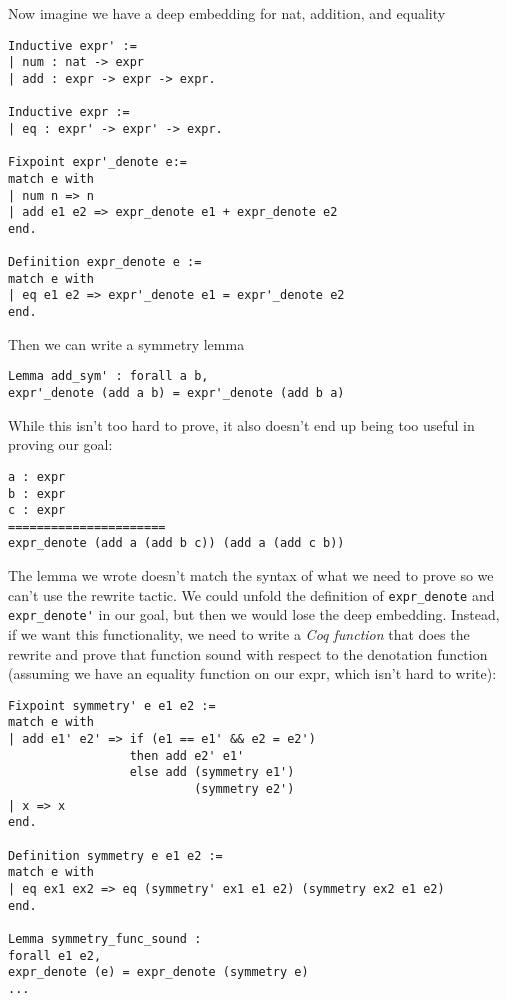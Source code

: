 \documentclass{puthesis}
\begin{document}
Now imagine we have a deep embedding for nat, addition, and equality

\begin{lstlisting}
Inductive expr' :=
| num : nat -> expr
| add : expr -> expr -> expr.

Inductive expr :=
| eq : expr' -> expr' -> expr.

Fixpoint expr'_denote e:=
match e with
| num n => n
| add e1 e2 => expr_denote e1 + expr_denote e2
end.

Definition expr_denote e :=
match e with
| eq e1 e2 => expr'_denote e1 = expr'_denote e2
end.
\end{lstlisting} 

Then we can write a symmetry lemma

\begin{lstlisting}
Lemma add_sym' : forall a b, 
expr'_denote (add a b) = expr'_denote (add b a)
\end{lstlisting}

While this isn't too hard to prove, it also doesn't end up being too
useful in proving our goal:

\begin{lstlisting}
a : expr
b : expr
c : expr
======================
expr_denote (add a (add b c)) (add a (add c b))  
\end{lstlisting}

The lemma we wrote doesn't match the syntax of what we need to prove
so we can't use the rewrite tactic. We could unfold the definition of
\lstinline|expr_denote| and \lstinline|expr_denote'| in our goal, but
then we would lose the deep embedding. Instead, if we want this
functionality, we need to write a \emph{Coq function} that does the
rewrite and prove that function sound with respect to the denotation
function (assuming we have an equality function on our expr, which
isn't hard to write):

\begin{lstlisting}
Fixpoint symmetry' e e1 e2 := 
match e with
| add e1' e2' => if (e1 == e1' && e2 = e2') 
                 then add e2' e1' 
                 else add (symmetry e1') 
                          (symmetry e2')
| x => x
end.

Definition symmetry e e1 e2 :=
match e with
| eq ex1 ex2 => eq (symmetry' ex1 e1 e2) (symmetry ex2 e1 e2)
end.

Lemma symmetry_func_sound : 
forall e1 e2,
expr_denote (e) = expr_denote (symmetry e)
...
\end{lstlisting}
\end{document}

